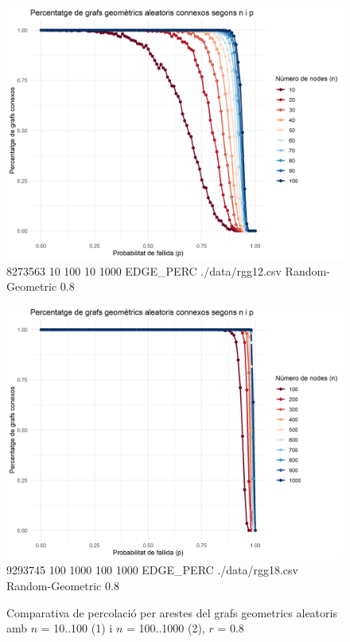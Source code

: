\documentclass[a4paper]{article}
\begin{document}
	
	\begin{figure}[H]
		\centering
		\begin{minipage}{0.45\textwidth}
			\centering
			\includegraphics[width=\textwidth]{images/randomGeometric_10-100_0.8}
			\footnotesize{8273563 10 100 10 1000 EDGE\_PERC ./data/rgg12.csv Random-Geometric 0.8}
		\end{minipage}
		\hfill
		\begin{minipage}{0.45\textwidth}
			\centering
			\includegraphics[width=\textwidth]{images/randomGeometric_100-1000_0.8}
			\footnotesize{9293745 100 1000 100 1000 EDGE\_PERC ./data/rgg18.csv Random-Geometric 0.8}
		\end{minipage}
		\caption{Comparativa de percolació per arestes del grafs geometrics aleatoris amb $n$ = 10..100 (1) i $n$ = 100..1000 (2), $r$ = 0.8}
		\label{fig:percolation_edges_rgg_0.8}
	\end{figure}
	
\end{document}

